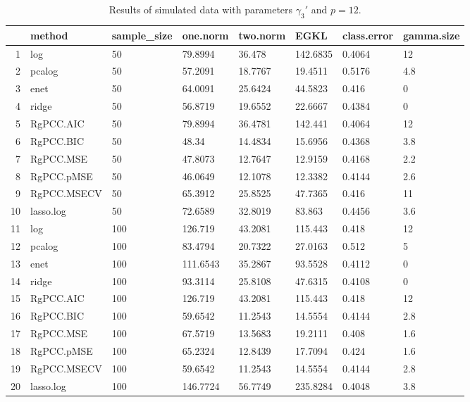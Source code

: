 \begin{table}[ht]
\centering
\begin{tabular}{rlllllll}
  \hline
 & method & sample\_size & one.norm & two.norm & EGKL & class.error & gamma.size \\ 
  \hline
1 & log & 50 & 79.8994 & 36.478 & 142.6835 & 0.4064 & 12 \\ 
  2 & pcalog & 50 & 57.2091 & 18.7767 & 19.4511 & 0.5176 & 4.8 \\ 
  3 & enet & 50 & 64.0091 & 25.6424 & 44.5823 & 0.416 & 0 \\ 
  4 & ridge & 50 & 56.8719 & 19.6552 & 22.6667 & 0.4384 & 0 \\ 
  5 & RgPCC.AIC & 50 & 79.8994 & 36.4781 & 142.441 & 0.4064 & 12 \\ 
  6 & RgPCC.BIC & 50 & 48.34 & 14.4834 & 15.6956 & 0.4368 & 3.8 \\ 
  7 & RgPCC.MSE & 50 & 47.8073 & 12.7647 & 12.9159 & 0.4168 & 2.2 \\ 
  8 & RgPCC.pMSE & 50 & 46.0649 & 12.1078 & 12.3382 & 0.4144 & 2.6 \\ 
  9 & RgPCC.MSECV & 50 & 65.3912 & 25.8525 & 47.7365 & 0.416 & 11 \\ 
  10 & lasso.log & 50 & 72.6589 & 32.8019 & 83.863 & 0.4456 & 3.6 \\ 
  11 & log & 100 & 126.719 & 43.2081 & 115.443 & 0.418 & 12 \\ 
  12 & pcalog & 100 & 83.4794 & 20.7322 & 27.0163 & 0.512 & 5 \\ 
  13 & enet & 100 & 111.6543 & 35.2867 & 93.5528 & 0.4112 & 0 \\ 
  14 & ridge & 100 & 93.3114 & 25.8108 & 47.6315 & 0.4108 & 0 \\ 
  15 & RgPCC.AIC & 100 & 126.719 & 43.2081 & 115.443 & 0.418 & 12 \\ 
  16 & RgPCC.BIC & 100 & 59.6542 & 11.2543 & 14.5554 & 0.4144 & 2.8 \\ 
  17 & RgPCC.MSE & 100 & 67.5719 & 13.5683 & 19.2111 & 0.408 & 1.6 \\ 
  18 & RgPCC.pMSE & 100 & 65.2324 & 12.8439 & 17.7094 & 0.424 & 1.6 \\ 
  19 & RgPCC.MSECV & 100 & 59.6542 & 11.2543 & 14.5554 & 0.4144 & 2.8 \\ 
  20 & lasso.log & 100 & 146.7724 & 56.7749 & 235.8284 & 0.4048 & 3.8 \\ 
   \hline
\end{tabular}
\caption{Results of simulated data with parameters $\gamma_3'$ and $p =12$. } 
\label{fig-3'-nonlead-new-algo-12-metrics-p}
\end{table}
